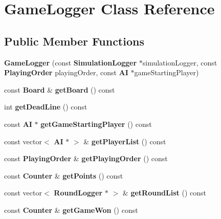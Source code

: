 \section{Game\-Logger Class Reference}
\label{class_game_logger}
\subsection*{Public Member Functions}
\begin{DoxyCompactItemize}
\item 
{\bfseries Game\-Logger} (const {\bf Simulation\-Logger} $\ast$simulation\-Logger, const {\bf Playing\-Order} playing\-Order, const {\bf A\-I} $\ast$game\-Starting\-Player)\label{class_game_logger_a9ccd538027b996730e546a936bfd97ea}

\item 
const {\bf Board} \& {\bfseries get\-Board} () const \label{class_game_logger_a200f1e95042330a8568a8c1e1d679529}

\item 
int {\bfseries get\-Dead\-Line} () const \label{class_game_logger_ad5181081324043367b7b3c04c461182d}

\item 
const {\bf A\-I} $\ast$ {\bfseries get\-Game\-Starting\-Player} () const \label{class_game_logger_a9d8059f296f6a4eb836c21059d82b468}

\item 
const vector$<$ {\bf A\-I} $\ast$ $>$ \& {\bfseries get\-Player\-List} () const \label{class_game_logger_a304f93438a2c2edded594de4e2a1d421}

\item 
const {\bf Playing\-Order} \& {\bfseries get\-Playing\-Order} () const \label{class_game_logger_a66bf007670b3934bee8e5538d7388001}

\item 
const {\bf Counter} \& {\bfseries get\-Points} () const \label{class_game_logger_a987619dec293b5ec4add94f41ab6f733}

\item 
const vector$<$ {\bf Round\-Logger} $\ast$ $>$ \& {\bfseries get\-Round\-List} () const \label{class_game_logger_a7c79f75b48e6a1e9f924f44408ae752f}

\item 
const {\bf Counter} \& {\bfseries get\-Game\-Won} () const \label{class_game_logger_ad499b496c00c5f25a484a90afd533c66}

\end{DoxyCompactItemize}

